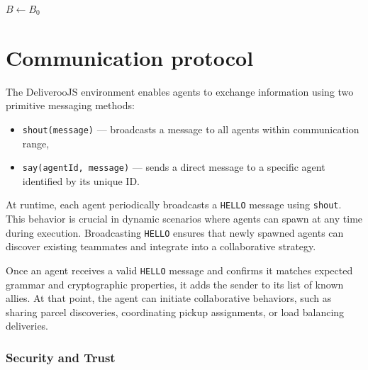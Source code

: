 \documentclass[conference]{IEEEtran}
\begin{document}
\begin{algorithm}
	\caption{BDI Control Loop}
	\label{alg:bdi-loop}
	$B \gets B_0$\;
\end{algorithm}

\section{Communication protocol}

The DeliverooJS environment enables agents to exchange information using two primitive messaging methods:
\begin{itemize}
	\item \texttt{shout(message)} — broadcasts a message to all agents within communication range,
	\item \texttt{say(agentId, message)} — sends a direct message to a specific agent identified by its unique ID.
\end{itemize}

At runtime, each agent periodically broadcasts a \texttt{HELLO} message using \texttt{shout}. This behavior is crucial in dynamic scenarios where agents can spawn at any time during execution. Broadcasting \texttt{HELLO} ensures that newly spawned agents can discover existing teammates and integrate into a collaborative strategy.

Once an agent receives a valid \texttt{HELLO} message and confirms it matches expected grammar and cryptographic properties, it adds the sender to its list of known allies. At that point, the agent can initiate collaborative behaviors, such as sharing parcel discoveries, coordinating pickup assignments, or load balancing deliveries.

\subsubsection{Security and Trust}
\end{document}
